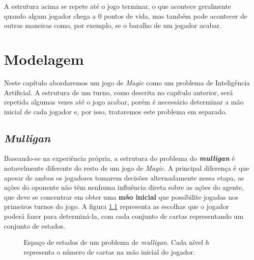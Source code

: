 \documentclass{book}
\begin{document}
A estrutura acima se repete até o jogo terminar, o que acontece geralmente quando algum jogador chega a 0 pontos de vida,
mas também pode acontecer de outras maneiras como, por exemplo, se o baralho de um jogador acabar.

\chapter{Modelagem}

Neste capítulo abordaremos um jogo de \textit{Magic} como um problema de Inteligência Artificial. A estrutura de um turno, como descrita
 no capítulo anterior, será repetida algumas vezes até o jogo acabar, porém é necessário determinar a mão inicial de cada jogador e, por isso,
 trataremos este problema em separado.

\section{\textit{Mulligan}}
Baseando-se na experiência própria, a estrutura do problema do \textbf{\textit{mulligan}} é notavelmente diferente do resto de um jogo de \textit{Magic}.
A principal diferença é que apesar de ambos os jogadores tomarem decisões alternadamente nessa etapa, as ações do oponente não têm nenhuma influência
direta sobre as ações do agente, que deve se concentrar em obter uma \textbf{mão inicial} que possibilite jogadas nos primeiros turnos do jogo.
A figura \ref{mulligan} representa as escolhas que o jogador poderá fazer para determiná-la, com cada conjunto de cartas representando um conjunto
de estados.

\begin{figure}
  \centering
  \label{mulligan}
  
  \caption{Espaço de estados de um problema de \textit{mulligan}. Cada nível $h$ representa o número de cartas na mão inicial do jogador.}
\end{figure}
\end{document}

